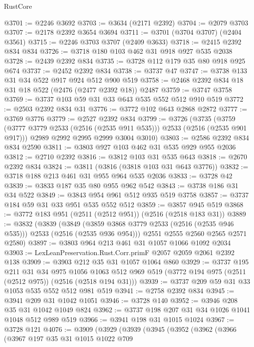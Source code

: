 \begin{lexlean}{RustCore}
\begin{coremodule}
@3701 := @2246 @3692
@3703 := @3634 (@2171 @2392)
@3704 := @2079 @3703
@3707 := @2178 @2392 @3654 @3694
@3711 := @3701 (@3704 @3707) (@2404 @3561)
@3715 := @2246 @3703 @3707 (@2409 @3633)
@3718 := @2415 @2392 @834 @834
@3726 := @3718 @180 @103 @462 @31 @918 @927 @535 @2038
@3728 := @2439 @2392 @834
@3735 := @3728 @112 @179 @35 @80 @918 @925 @674
@3737 := @2452 @2392 @834
@3738 := @3737 @47
@3747 := @3738 @133 @31 @34 @522 @917 @924 @512 @900 @519
@3758 := @2468 @2392 @834 @18 @31 @18 @522 (@2476 (@2477 @2392 @18)) @2487
@3759 := @3747 @3758
@3769 := @3737 @103 @59 @31 @33 @643 @535 @552 @512 @910 @519
@3772 := @2503 @2392 @834 @31
@3776 := @3772 @102 @643 @2868 @2872
@3777 := @3769 @3776
@3779 := @2527 @2392 @834
@3799 := @3726
    (@3735
      (@3759 (@3777 @3779 @2533 (@2516 (@2535 @911 @535))) @2533 (@2516 (@2535 @901 @917)))
      @2989
      @2992
      @2995
      @2999
      @3004
      @3010)
@3803 := @2586 @2392 @834 @834 @2590
@3811 := @3803 @927 @103 @462 @31 @535 @929 @955 @2036
@3812 := @2710 @2392
@3816 := @3812 @103 @31 @535 @643
@3818 := @2670 @2392 @834
@3824 := @3811 (@3816 (@3818 @103 @31 @643 @3776))
@3832 := @3718 @188 @213 @461 @31 @955 @964 @535 @2036
@3833 := @3728 @42
@3839 := @3833 @187 @35 @80 @955 @962 @542
@3843 := @3738 @186 @31 @34 @522
@3849 := @3843 @954 @961 @512 @935 @519 @3758
@3857 := @3737 @184 @59 @31 @33 @951 @535 @552 @512
@3859 := @3857 @945 @519
@3868 := @3772 @183 @951 (@2511 (@2512 @951)) (@2516 (@2518 @183 @31))
@3889 := @3832
    (@3839
      (@3849 (@3859 @3868 @3779 @2533 (@2516 (@2535 @946 @535))) @2533 (@2516 (@2535 @936 @954)))
      @2551
      @2555
      @2560
      @2565
      @2571
      @2580)
@3897 := @3803 @964 @213 @461 @31 @1057 @1066 @1092 @2034
@3903 := LexLeanPreservation.Rust.Corr.primF @2057 @2059 @2061 @2392 @138
@3909 := @3903 @212 @35 @31 @1057 @1064 @860
@3929 := @3737
    @195
    @211
    @31
    @34
    @975
    @1056
    @1063
    @512
    @969
    @519
    (@3772 @194 @975 (@2511 (@2512 @975)) (@2516 (@2518 @194 @31)))
@3939 := @3737 @209 @59 @31 @33 @1053 @535 @552 @512 @981 @519
@3941 := @2758 @2392 @834
@3945 := @3941 @209 @31 @1042 @1051
@3946 := @3728 @140
@3952 := @3946 @208 @35 @31 @1042 @1049 @824
@3962 := @3737 @198 @207 @31 @34 @1026 @1041 @1048 @512 @989 @519
@3966 := @3941 @198 @31 @1015 @1024
@3967 := @3728 @121
@4076 := @3909
    (@3929
      (@3939
        (@3945
          (@3952
            (@3962
              (@3966
                (@3967
                  @197
                  @35
                  @31
                  @1015
                  @1022
                  @709

\end{coremodule}
\end{lexlean}
